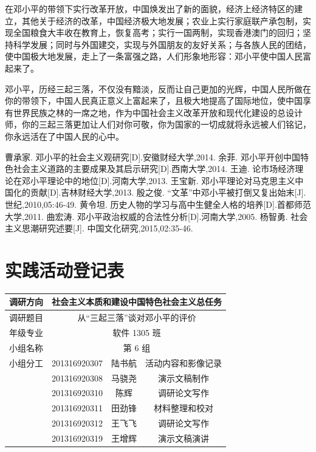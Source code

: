 \documentclass[cs4size,a4paper,nofonts,twoside]{ctexart}
\def\titlec{从“三起三落”谈对邓小平的评价 }
\begin{document}
在邓小平的带领下实行改革开放，中国焕发出了新的面貌，经济上经济特区的建立，其他关于经济的改革，中国经济极大地发展；农业上实行家庭联产承包制，实现全国粮食大丰收在教育上，恢复高考；实行一国两制，实现香港澳门的回归；坚持科学发展；同时与外国建交，实现与外国朋友的友好关系；与各族人民的团结，使中国极大地发展，走上了一条富强之路，人们形象地形容：邓小平使中国人民富起来了。

邓小平，历经三起三落，不仅没有黯淡，反而让自己更加的光辉，中国人民所做在你的带领下，中国人民真正意义上富起来了，且极大地提高了国际地位，使中国享有世界民族之林的一席之地，作为中国社会主义改革开放和现代化建设的总设计师，你的三起三落更加让人们对你可敬，你为国家的一切成就将永远被人们铭记，你永远活在了中国人民的心中。

\newpage

\begin{thebibliography}{10}
 曹承家. 邓小平的社会主义观研究[D].安徽财经大学,2014.
 余菲. 邓小平开创中国特色社会主义道路的主要成果及其启示研究[D].西南大学,2014.
 王迪. 论市场经济理论在邓小平理论中的地位[D].河南大学,2013.
 王宝新. 邓小平理论对马克思主义中国化的贡献[D].吉林财经大学,2013.
 殷之俊. “文革”中邓小平被打倒又复出始末[J]. 世纪,2010,05:46-49.
 黄令坦. 历史人物的学习与高中生健全人格的培养[D].首都师范大学,2011.
 曲宏涛. 邓小平政治权威的合法性分析[D].河南大学,2005.
 杨智勇. 社会主义思潮研究述要[J]. 中国文化研究,2015,02:35-46.
\end{thebibliography}

\cleardoublepage
\setcounter{page}{1}

\section*{实践活动登记表}

\vspace*{4em}
\begin{center}
\begin{tabular}{|c|c|c|c|}\hline
调研方向 & \multicolumn{3}{c|}{社会主义本质和建设中国特色社会主义总任务} \\\hline
调研题目 & \multicolumn{3}{c|}{\titlec} \\\hline
年级专业 & \multicolumn{3}{c|}{软件 1305 班} \\\hline
小组名称 & \multicolumn{3}{c|}{第 6 组} \\\hline
小组分工
& 201316920307 & 陆书航 & 活动内容和影像记录 \\\hline
& 201316920308 & 马骁尧 & 演示文稿制作 \\\hline
& 201316920310 & 陈辉 & 调研论文写作 \\\hline
& 201316920311 & 田劲锋 & 材料整理和校对 \\\hline
& 201316920312 & 王飞飞 & 调研论文写作 \\\hline
& 201316920319 & 王增辉 & 演示文稿演讲 \\\hline
\end{tabular}
\end{center}
\end{document}

